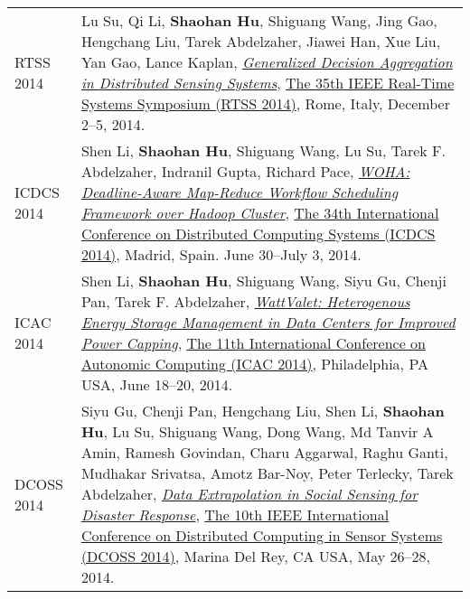 \begin{longtabu}{p{.51\sectionwidth} p{.78\resumewidth}}
{\sc RTSS 2014}\hypertarget{su2014rtss}{} &
Lu Su, Qi Li, \textbf{Shaohan Hu}, Shiguang Wang, Jing Gao, Hengchang Liu, Tarek Abdelzaher, Jiawei Han, Xue Liu, Yan Gao, Lance Kaplan,
\href{http://ieeexplore.ieee.org/document/7010369}{\emph{Generalized Decision Aggregation in Distributed Sensing Systems}},
\href{http://2014.rtss.org/}{\textsf{The 35th IEEE Real-Time Systems Symposium (RTSS 2014)}},
Rome, Italy, December 2--5, 2014. \\

{\sc ICDCS 2014}\hypertarget{li2014icdcs}{} &
Shen Li, \textbf{Shaohan Hu}, Shiguang Wang, Lu Su, Tarek F. Abdelzaher, Indranil Gupta, Richard Pace,
\href{http://ieeexplore.ieee.org/document/6888886}{\emph{WOHA: Deadline-Aware Map-Reduce Workflow Scheduling Framework over Hadoop Cluster}},
\href{http://lsd.ls.fi.upm.es/icdcs2014}{\textsf{The 34th International Conference on Distributed Computing Systems (ICDCS 2014)}},
Madrid, Spain. June 30--July 3, 2014. \\

{\sc ICAC 2014}\hypertarget{li2014icac}{} &
Shen Li, \textbf{Shaohan Hu}, Shiguang Wang, Siyu Gu, Chenji Pan, Tarek F. Abdelzaher,
\href{https://www.usenix.org/system/files/conference/icac14/icac14-paper-li_shen.pdf}{\emph{WattValet: Heterogenous Energy Storage Management in Data Centers for Improved Power Capping}},
\href{https://www.usenix.org/conference/icac14}{\textsf{The 11th International Conference on Autonomic Computing (ICAC 2014)}},
Philadelphia, PA USA, June 18--20, 2014. \\

{\sc DCOSS 2014}\hypertarget{gu2014dcoss}{} &
Siyu Gu, Chenji Pan, Hengchang Liu, Shen Li, \textbf{Shaohan Hu}, Lu Su, Shiguang Wang, Dong Wang, Md Tanvir A Amin, Ramesh Govindan, Charu Aggarwal, Raghu Ganti, Mudhakar Srivatsa, Amotz Bar-Noy, Peter Terlecky, Tarek Abdelzaher,
\href{http://ieeexplore.ieee.org/document/6846153}{\emph{Data Extrapolation in Social Sensing for Disaster Response}},
\href{http://www.dcoss.org/dcoss14/}{\textsf{The 10th IEEE International Conference on Distributed Computing in Sensor Systems (DCOSS 2014)}},
Marina Del Rey, CA USA, May 26--28, 2014. \\



\end{longtabu}
